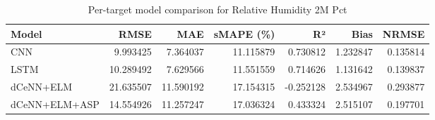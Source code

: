 \begin{table}
\caption{Per-target model comparison for Relative Humidity 2M Pct}
\begin{tabular}{lrrrrrr}
\toprule
Model & RMSE & MAE & sMAPE (\%) & R² & Bias & NRMSE \\
\midrule
CNN & 9.993425 & 7.364037 & 11.115879 & 0.730812 & 1.232847 & 0.135814 \\
LSTM & 10.289492 & 7.629566 & 11.551559 & 0.714626 & 1.131642 & 0.139837 \\
dCeNN+ELM & 21.635507 & 11.590192 & 17.154315 & -0.252128 & 2.534967 & 0.293877 \\
dCeNN+ELM+ASP & 14.554926 & 11.257247 & 17.036324 & 0.433324 & 2.515107 & 0.197701 \\
\bottomrule
\end{tabular}
\end{table}
